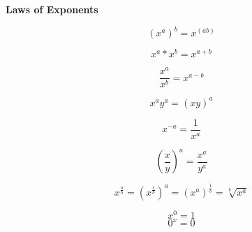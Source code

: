 \documentclass{article}
\begin{document}
\textbf{Laws of Exponents}

\begin{equation}
\left( {x^a } \right)^b = x^{\left( {ab} \right)}
\end{equation}

\begin{equation}
x^{a} * x^{b} = x^{a+b}
\end{equation}

\begin{equation}
\frac{x^{a}}{  x^{b}} = x^{a-b}
\end{equation}

\begin{equation}
x^{a}  y^{a} = \left(xy\right)^{a}
\end{equation}

\begin{equation}
x^{-a} = \frac{1}{x^{a}}
\end{equation}

\begin{equation}
\left( {\frac{x}{y}} \right)^a =  \frac{x^a}{y^a}
\end{equation}

\begin{equation}
x^{\frac{a}{b}} = \left( x^{\frac{1}{b}} \right)^{a} =\left( x^{a} \right)^{\frac{1}{b}} = \sqrt[b]{x^{a}}
\end{equation}

\begin{equation}
x^{0} = 1
\end{equation}
\begin{equation}
0^{x} = 0
\end{equation}
\end{document}
